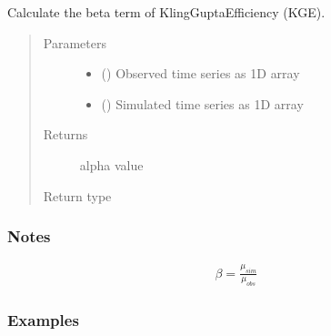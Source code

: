 \documentclass[letterpaper,10pt,english]{sphinxmanual}
\begin{document}
\begin{fulllineitems}
\label{\detokenize{reference/kge:de.kge.calc_kge_beta}}
Calculate the beta term of Kling\sphinxhyphen{}Gupta\sphinxhyphen{}Efficiency (KGE).
\begin{quote}\begin{description}
\item[{Parameters}] \leavevmode\begin{itemize}
\item {} 
 (\sphinxstyleliteralemphasis{\sphinxupquote{(}}\sphinxstyleliteralemphasis{\sphinxupquote{,}}\sphinxstyleliteralemphasis{\sphinxupquote{)}}) \textendash{} Observed time series as 1\sphinxhyphen{}D array

\item {} 
 (\sphinxstyleliteralemphasis{\sphinxupquote{(}}\sphinxstyleliteralemphasis{\sphinxupquote{,}}\sphinxstyleliteralemphasis{\sphinxupquote{)}}) \textendash{} Simulated time series as 1\sphinxhyphen{}D array

\end{itemize}

\item[{Returns}] \leavevmode
{} \textendash{} alpha value

\item[{Return type}] \leavevmode
{}

\end{description}\end{quote}
\subsubsection*{Notes}
\begin{equation*}
\begin{split}\beta = \frac{\mu_{sim}}{\mu_{obs}}\end{split}
\end{equation*}\subsubsection*{Examples}


\end{fulllineitems}
\end{document}
